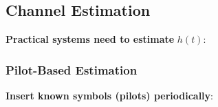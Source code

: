 \begin{Shaded}
\begin{Highlighting}[]
\OperatorTok{=}\NormalTok{)}
\NormalTok{)}
\NormalTok{)}
\NormalTok{)}
\NormalTok{)}
\end{Highlighting}
\end{Shaded}


\subsection{Channel Estimation}\label{channel-estimation}

\textbf{Practical systems need to estimate} \(h(t)\):

\subsubsection{Pilot-Based Estimation}\label{pilot-based-estimation}

\textbf{Insert known symbols (pilots) periodically}:

